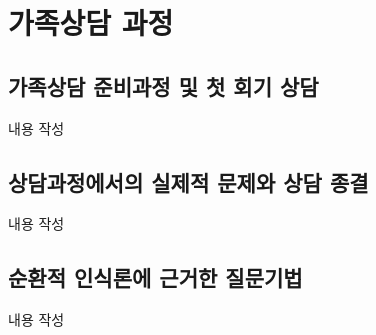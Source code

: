 \section{가족상담 과정}

\subsection{가족상담 준비과정 및 첫 회기 상담}
내용 작성

\subsection{상담과정에서의 실제적 문제와 상담 종결}
내용 작성

\subsection{순환적 인식론에 근거한 질문기법}
내용 작성

